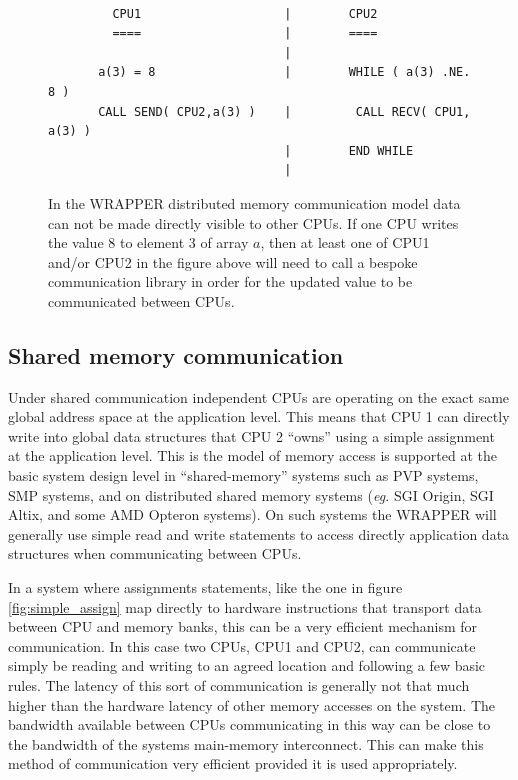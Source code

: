 \begin{figure}
\begin{verbatim}

         CPU1                    |        CPU2
         ====                    |        ====
                                 |
       a(3) = 8                  |        WHILE ( a(3) .NE. 8 )
       CALL SEND( CPU2,a(3) )    |         CALL RECV( CPU1, a(3) )
                                 |        END WHILE
                                 |
\end{verbatim}
\caption{ In the WRAPPER distributed memory communication model
data can not be made directly visible to other CPUs.
If one CPU writes the value $8$ to element $3$ of array $a$, then
at least one of CPU1 and/or CPU2 in the figure above will need
to call a bespoke communication library in order for the updated 
value to be communicated between CPUs.
} \label{fig:comm_msg}
\end{figure}

\subsection{Shared memory communication}
\label{sec:shared_memory_communication}

Under shared communication independent CPUs are operating on the
exact same global address space at the application level.  This means
that CPU 1 can directly write into global data structures that CPU 2
``owns'' using a simple assignment at the application level.  This is
the model of memory access is supported at the basic system design
level in ``shared-memory'' systems such as PVP systems, SMP systems,
and on distributed shared memory systems (\textit{eg.} SGI Origin, SGI
Altix, and some AMD Opteron systems).  On such systems the WRAPPER
will generally use simple read and write statements to access directly
application data structures when communicating between CPUs.

In a system where assignments statements, like the one in figure
\ref{fig:simple_assign} map directly to hardware instructions that
transport data between CPU and memory banks, this can be a very
efficient mechanism for communication.  In this case two CPUs, CPU1
and CPU2, can communicate simply be reading and writing to an agreed
location and following a few basic rules.  The latency of this sort of
communication is generally not that much higher than the hardware
latency of other memory accesses on the system. The bandwidth
available between CPUs communicating in this way can be close to the
bandwidth of the systems main-memory interconnect.  This can make this
method of communication very efficient provided it is used
appropriately.

